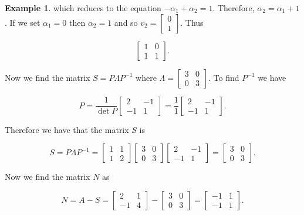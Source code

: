\documentclass[12pt]{article}
\theoremstyle{definition}
\newtheorem*{example}{Example}
\begin{document}
\begin{example}
which reduces to the equation $-\alpha_1 + \alpha_2 = 1$. Therefore, $\alpha_2 = \alpha_1 + 1$. If
we set $\alpha_1 = 0$ then $\alpha_2 = 1$ and so $v_2 = \begin{bmatrix} 0 \\ 1 \end{bmatrix}$. Thus

\begin{equation*}
\begin{bmatrix}
1 & 0 \\
1 & 1 
\end{bmatrix}.
\end{equation*}

Now we find the matrix $S = P \Lambda P^{-1}$ where
$\Lambda = \begin{bmatrix} 3 & 0 \\ 0 & 3 \end{bmatrix}$. To find $P^{-1}$ we have

\begin{equation*}
P = \dfrac{1}{\det{P}}
\begin{bmatrix}
2 & -1 \\
-1 & 1
\end{bmatrix}
=
\dfrac{1}{1}
\begin{bmatrix}
2 & -1 \\
-1 & 1
\end{bmatrix}.
\end{equation*}

Therefore we have that the matrix $S$ is

\begin{equation*}
S = P \Lambda P^{-1} =
\begin{bmatrix}
1 & 1 \\
1 & 2
\end{bmatrix}
\begin{bmatrix}
3 & 0 \\
0 & 3
\end{bmatrix}
\begin{bmatrix}
2 & -1 \\
-1 & 1
\end{bmatrix}
=
\begin{bmatrix}
3 & 0 \\
0 & 3
\end{bmatrix}.
\end{equation*}

Now we find the matrix $N$ as

\begin{equation*}
N = A - S = 
\begin{bmatrix}
2 & 1 \\
-1 & 4
\end{bmatrix}
-
\begin{bmatrix}
3 & 0 \\
0 & 3
\end{bmatrix}
=
\begin{bmatrix}
-1 & 1 \\
-1 & 1
\end{bmatrix}.
\end{equation*}


\end{example}
\end{document}
